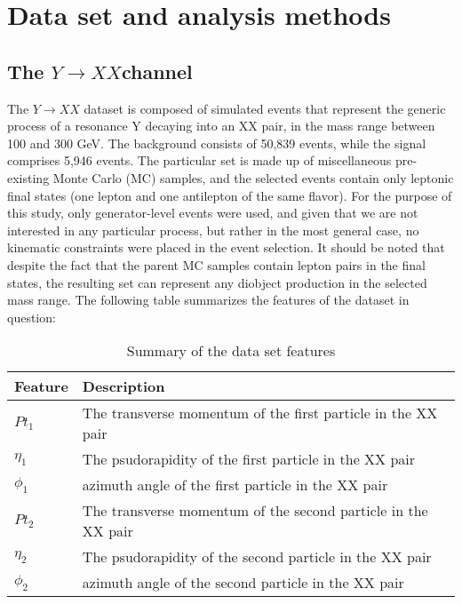 \section{Data set and analysis methods}
\label{sec:org65db251}
\subsection{The \(Y \rightarrow XX\)channel}
\label{sec:org0fd1492}
The \(Y \rightarrow XX\) dataset is composed of simulated events that represent the generic process of a resonance Y decaying into an XX pair, in the mass range between 100 and 300 GeV. The background consists of 50,839 events, while the signal comprises 5,946 events. The particular set is made up of miscellaneous pre-existing Monte Carlo (MC) samples, and the selected events contain only leptonic final states (one lepton and one antilepton of the same flavor). For the purpose of this study, only generator-level events were used, and given that we are not interested in any particular process, but rather in the most general case, no kinematic constraints were placed in the event selection. It should be noted that despite the fact that the parent MC samples contain lepton pairs in the final states, the resulting set can represent any diobject production in the selected mass range. The following table summarizes the features of the dataset in question:

\begin{table}[h!]
\centering
\begin{tabular}{ |p{3cm}|p{10cm}|  }
 \hline
Feature & Description \\
 \hline
$Pt_{1}$ &  The transverse momentum of the first particle in the XX pair \\
 \hline
$\eta_{1}$ &  The psudorapidity of the first particle in the XX pair \\
 \hline
$\phi_{1}$ &   azimuth angle of the first particle in the XX pair \\
 \hline
$Pt_{2}$ &  The transverse momentum of the second particle in the XX pair \\
 \hline
$\eta_{2}$ &  The psudorapidity of the second particle in the XX pair \\
 \hline
$\phi_{2}$ &   azimuth angle of the second particle in the XX pair \\
 \hline
\end{tabular}
\caption{Summary of the data set features }
\label{table:DataSetFeatures}
\end{table}

